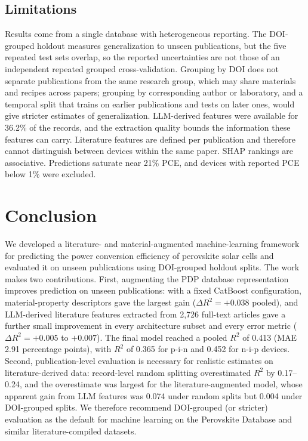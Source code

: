 \documentclass[3p]{elsarticle}
\begin{document}
\subsection{Limitations}
Results come from a single database with heterogeneous reporting. The DOI-grouped holdout measures generalization to unseen publications, but the five repeated test sets overlap, so the reported uncertainties are not those of an independent repeated grouped cross-validation. Grouping by DOI does not separate publications from the same research group, which may share materials and recipes across papers; grouping by corresponding author or laboratory, and a temporal split that trains on earlier publications and tests on later ones, would give stricter estimates of generalization. LLM-derived features were available for 36.2\% of the records, and the extraction quality bounds the information these features can carry. Literature features are defined per publication and therefore cannot distinguish between devices within the same paper. SHAP rankings are associative. Predictions saturate near 21\% PCE, and devices with reported PCE below 1\% were excluded.

\section{Conclusion}
We developed a literature- and material-augmented machine-learning framework for predicting the power conversion efficiency of perovskite solar cells and evaluated it on unseen publications using DOI-grouped holdout splits. The work makes two contributions. First, augmenting the PDP database representation improves prediction on unseen publications: with a fixed CatBoost configuration, material-property descriptors gave the largest gain ($\Delta R^2 = +0.038$ pooled), and LLM-derived literature features extracted from 2,726 full-text articles gave a further small improvement in every architecture subset and every error metric ($\Delta R^2 = +0.005$ to $+0.007$). The final model reached a pooled $R^2$ of 0.413 (MAE 2.91 percentage points), with $R^2$ of 0.365 for p-i-n and 0.452 for n-i-p devices. Second, publication-level evaluation is necessary for realistic estimates on literature-derived data: record-level random splitting overestimated $R^2$ by 0.17--0.24, and the overestimate was largest for the literature-augmented model, whose apparent gain from LLM features was 0.074 under random splits but 0.004 under DOI-grouped splits. We therefore recommend DOI-grouped (or stricter) evaluation as the default for machine learning on the Perovskite Database and similar literature-compiled datasets.



\end{document}
